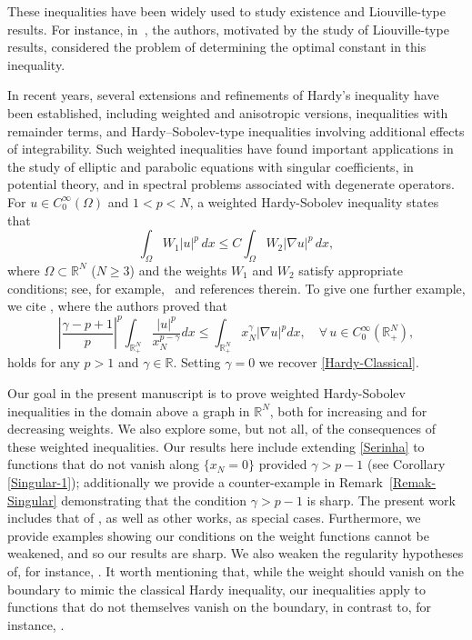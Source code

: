 \documentclass[12pt]{amsart}
\theoremstyle{definition}
\theoremstyle{plain}
\begin{document}
These inequalities have been widely used to study existence and Liouville-type results. For 
instance, in~\cite{zbMATH05077864,Athanasios}, the authors, motivated by the 
study of Liouville-type results, 
considered the problem of determining the optimal constant in this inequality.

In recent years, several extensions and refinements of Hardy’s inequality have 
been established, 
including weighted and anisotropic versions, inequalities with remainder terms, and 
Hardy–Sobolev-type inequalities involving additional effects of integrability. Such weighted 
inequalities have found important applications in the study of elliptic and parabolic equations 
with singular coefficients, in potential theory, and in spectral problems associated with 
degenerate operators. For \( u \in C_0^\infty(\Omega) \) and \( 1 < p < N \), a weighted 
Hardy-Sobolev inequality states that
\begin{equation}\label{Geral}
\int_{\Omega} W_1 |u|^p \, dx \leq C \int_{\Omega} W_2 |\nabla u|^p \, dx,
\end{equation}
where \( \Omega \subset \mathbb{R}^N \) (\( N \ge 3 \)) and the weights $W_1$ and 
$W_2$ satisfy appropriate conditions; see, for example,~\cite{Brezis1, Opic} and 
references therein. To give one further example, we cite 
\cite[Theorem 6.9]{Ambrosio-Dipierro}, where the authors proved that 
\begin{equation}\label{Serinha}
		\left|\frac{\gamma-p+1}{p}\right|^p\int_{\mathbb{R}^N_+} \frac{|u|^p}{x_N^{p-\gamma}}dx
        \leq\int_{\mathbb{R}^N_+} x_N^\gamma|\nabla u|^pdx,\quad \forall \,u\in C_0^\infty (\mathbb{R}^N_+),
	\end{equation}
holds for any $p>1$ and $\gamma\in \mathbb{R}$. Setting $\gamma=0$ we 
recover \eqref{Hardy-Classical}.

Our goal in the present manuscript is to prove weighted Hardy-Sobolev 
inequalities in the domain above a graph in $\mathbb{R}^N$, both for 
increasing and for decreasing weights. We also explore some, but not all, 
of the consequences of these weighted inequalities. Our results here include 
extending \eqref{Serinha} to functions that do not vanish 
along $\{ x_N = 0\}$ provided $\gamma>p-1$ (see Corollary \ref{Singular-1}); 
additionally we provide a counter-example in Remark~\ref{Remak-Singular}
demonstrating that the 
condition $\gamma > p-1$ is sharp. 
The present work includes that 
of \cite{Abreu-Felix-Medeiros,Abreu-Furtado-Medeiros}, as well as other works, 
as special cases. Furthermore, we provide examples showing our conditions on 
the weight functions cannot be weakened, and so our results are sharp. 
We also weaken the 
regularity hypotheses of, for instance, \cite{Lewis}. It worth mentioning that, 
while the weight 
should vanish on the boundary to mimic the classical Hardy inequality, our inequalities 
apply to functions that do not themselves vanish on the boundary, in contrast 
to, for instance, \cite{Cossetti-DArca}.
\end{document}
